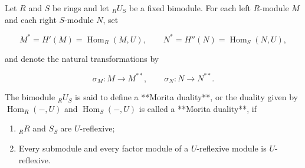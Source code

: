 Let $R$ and $S$ be rings and let ${}_R U_S$ be a fixed bimodule. For each left $R$-module $M$ and each right $S$-module $N$, set

$$M^* = H'(M) = \operatorname{Hom}_R(M, U), \qquad N^* = H''(N) = \operatorname{Hom}_S(N, U),$$

and denote the natural transformations by

$$\sigma_M: M \to M^{**}, \qquad \sigma_N: N \to N^{**}.$$

The bimodule ${}_R U_S$ is said to define a **Morita duality**, or the duality given by $\operatorname{Hom}_R(-, U)$ and $\operatorname{Hom}_S(-, U)$ is called a **Morita duality**, if

\begin{enumerate}
\item[(1)] ${}_R R$ and $S_S$ are $U$-reflexive;
\item[(2)] Every submodule and every factor module of a $U$-reflexive module is $U$-reflexive.
\end{enumerate}
